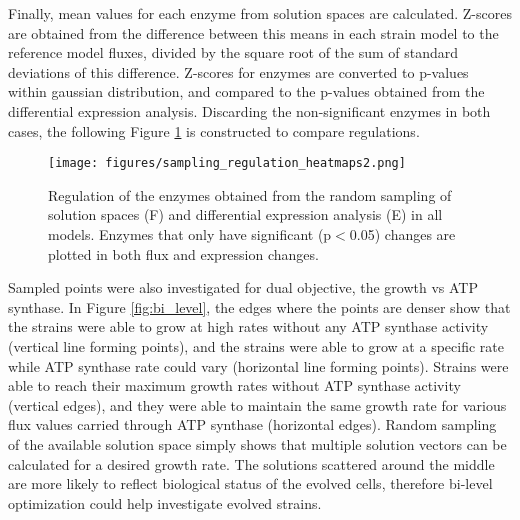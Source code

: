 \vspace{-1cm}



Finally, mean values for each enzyme from solution spaces are calculated. Z-scores are obtained from the difference between this means in each strain model to the reference model fluxes, divided by the square root of the sum of standard deviations of this difference. Z-scores for enzymes are converted to p-values within gaussian distribution, and compared to the p-values obtained from the differential expression analysis. Discarding the non-significant enzymes in both cases, the following Figure \ref{fig:sampling_regulation_heatmaps} is constructed to compare regulations.

\begin{figure}[H]
  \begin{center}
  \texttt{[image: figures/sampling\_regulation\_heatmaps2.png]}
  \caption[Regulation of the enzymes obtained from the random sampling of solution spaces (F) and differential expression analysis (E) in all models. Enzymes that only have significant (p$<$0.05) changes are plotted in both flux and expression changes]{Regulation of the enzymes obtained from the random sampling of solution spaces (F) and differential expression analysis (E) in all models. Enzymes that only have significant (p$<$0.05) changes are plotted in both flux and expression changes. }
  \label{fig:sampling_regulation_heatmaps}
  \end{center}
\end{figure}

\vspace{-1cm}

Sampled points were also investigated for dual objective, the growth vs ATP synthase. In Figure \ref{fig:bi_level}, the edges where the points are denser show that the strains were able to grow at high rates without any ATP synthase activity (vertical line forming points), and the strains were able to grow at a specific rate while ATP synthase rate could vary (horizontal line forming points). Strains were able to reach their maximum growth rates without ATP synthase activity (vertical edges), and they were able to maintain the same growth rate for various flux values carried through ATP synthase (horizontal edges). Random sampling of the available solution space simply shows that multiple solution vectors can be calculated for a desired growth rate. The solutions scattered around the middle are more likely to reflect biological status of the evolved cells, therefore bi-level optimization could help investigate evolved strains.

